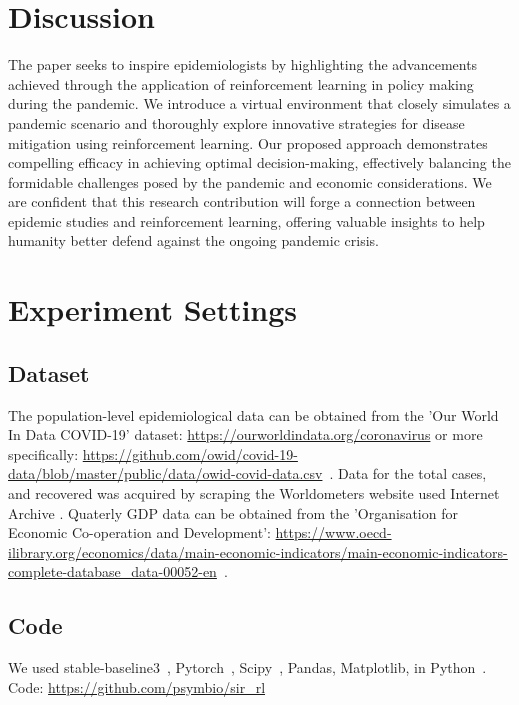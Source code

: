 \documentclass[tikz,fleqn,12pt]{wlscirep}
\begin{document}
\section{Discussion}
The paper seeks to inspire epidemiologists by highlighting the advancements achieved through the application of reinforcement learning in policy making during the pandemic. We introduce a virtual environment that closely simulates a pandemic scenario and thoroughly explore innovative strategies for disease mitigation using reinforcement learning. Our proposed approach demonstrates compelling efficacy in achieving optimal decision-making, effectively balancing the formidable challenges posed by the pandemic and economic considerations. We are confident that this research contribution will forge a connection between epidemic studies and reinforcement learning, offering valuable insights to help humanity better defend against the ongoing pandemic crisis.

\section{Experiment Settings}
\subsection{Dataset}
The population-level epidemiological data can be obtained from the 'Our World In Data COVID-19' dataset: \url{https://ourworldindata.org/coronavirus} or more specifically: \url{https://github.com/owid/covid-19-data/blob/master/public/data/owid-covid-data.csv}~\cite{owidcoronavirus}. Data for the total cases, and recovered was acquired by scraping the Worldometers website \cite{WorldometerCorona} used Internet Archive \cite{InternetArchive}. Quaterly GDP data can be obtained from the 'Organisation for Economic Co-operation and Development': \url{https://www.oecd-ilibrary.org/economics/data/main-economic-indicators/main-economic-indicators-complete-database_data-00052-en}~\cite{economic_indicators_data}.

\subsection{Code}
We used stable-baseline3~\cite{JMLR:v22:20-1364}, Pytorch~\cite{paszke2019pytorch}, Scipy~\cite{Virtanen_2020}, Pandas, Matplotlib, in Python~\cite{ScientificPython}.
Code: \url{https://github.com/psymbio/sir_rl}
% 

\end{document}
